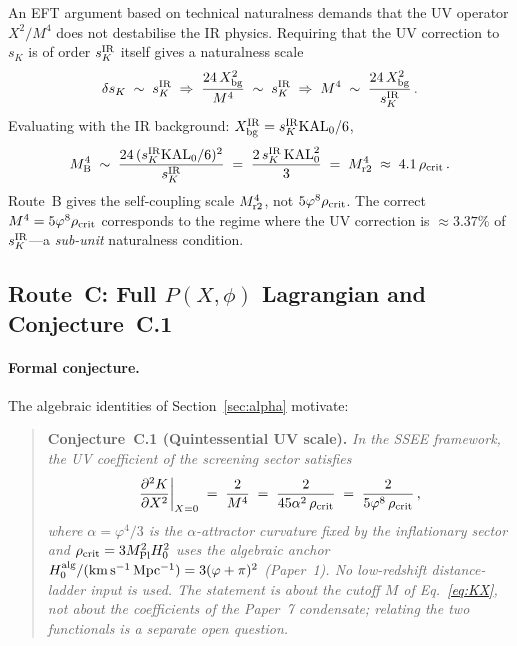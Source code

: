 \documentclass[12pt,a4paper]{article}
\newcommand{\phiG}{\varphi}
\newcommand{\KAL}{\mathrm{KAL}_0}
\newcommand{\Mpl}{M_{\mathrm{Pl}}}
\newcommand{\sK}{s_K}
\newcommand{\rhoc}{\rho_{\rm crit}}
\begin{document}
An EFT argument based on technical naturalness \citep{tHooft1980} demands
that the UV operator $X^2/M^4$ does not destabilise the IR physics.
Requiring that the UV correction to $\sK$ is of order $\sK^{\rm IR}$
itself gives a naturalness scale
\begin{equation}
  \delta\sK \;\sim\; \sK^{\rm IR}
  \;\Rightarrow\;
  \frac{24\,X_{\rm bg}^2}{M^4} \;\sim\; \sK^{\rm IR}
  \;\Rightarrow\;
  M^4 \;\sim\; \frac{24\,X_{\rm bg}^2}{\sK^{\rm IR}}\,.
\end{equation}
Evaluating with the IR background: $X_{\rm bg}^{\rm IR} = \sK^{\rm IR}\KAL/6$,
\begin{equation}
  M^4_{\rm B}
  \;\sim\; \frac{24\,(\sK^{\rm IR}\KAL/6)^2}{\sK^{\rm IR}}
  \;=\; \frac{2\,\sK^{\rm IR}\,\KAL^2}{3}
  \;=\; M^4_{\rm r2} \;\approx\; 4.1\,\rhoc\,.
\end{equation}
Route~B gives the self-coupling scale $M^4_{\rm r2}$, not $5\phiG^8\rhoc$.
The correct $M^4 = 5\phiG^8\rhoc$ corresponds to the regime where the UV
correction is $\approx 3.37\%$ of $\sK^{\rm IR}$---a \emph{sub-unit}
naturalness condition.

\subsection{Route~C: Full $P(X,\phi)$ Lagrangian and Conjecture~C.1}
\label{sec:routeC}
\label{sec:theorem}

\paragraph{Formal conjecture.}
The algebraic identities of Section~\ref{sec:alpha} motivate:

\medskip
\begin{quote}
\textbf{Conjecture~C.1 (Quintessential UV scale).}
\textit{In the SSEE framework, the UV coefficient of the screening
sector satisfies
\begin{equation}
  \frac{\partial^2 K}{\partial X^2}\bigg|_{X=0}
  \;=\; \frac{2}{M^4}
  \;=\; \frac{2}{45\alpha^2\,\rhoc}
  \;=\; \frac{2}{5\phiG^8\,\rhoc}\,,
  \label{eq:conjecture}
\end{equation}
where $\alpha = \phiG^4/3$ is the $\alpha$-attractor curvature fixed by
the inflationary sector and $\rhoc = 3\Mpl^2 H_0^2$ uses the algebraic anchor
$H_0^{\rm alg}/(\mathrm{km\,s^{-1}\,Mpc^{-1}}) = 3(\phiG+\pi)^2$ (Paper~1).
No low-redshift distance-ladder input is used. The statement is about the
cutoff $M$ of Eq.~\eqref{eq:KX}, not about the coefficients of the
Paper~7 condensate; relating the two functionals is a separate open
question.}
\end{quote}
\end{document}
